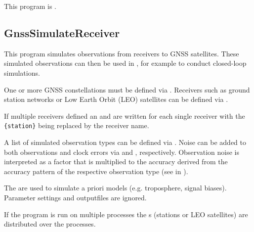 This program is .
\clearpage
\subsection{GnssSimulateReceiver}\label{GnssSimulateReceiver}
This program simulates observations from receivers to GNSS satellites.
These simulated observations can then be used in , for example to conduct closed-loop simulations.

One or more GNSS constellations must be defined via .
Receivers such as ground station networks or Low Earth Orbit (LEO) satellites can be defined via .

If multiple receivers defined an  and 
are written for each single receiver with the  \verb|{station}| being replaced by the receiver name.

A list of simulated observation types can be defined via . Noise can be added to both observations and clock errors
via  and , respectively. Observation noise is
interpreted as a factor that is multiplied to the accuracy derived from the accuracy pattern of the respective observation type
(see  in ).

The  are used to simulate a priori models (e.g. troposphere, signal biases).
Parameter settings and outputfiles are ignored.

If the program is run on multiple processes the s
(stations or LEO satellites) are distributed over the processes.


